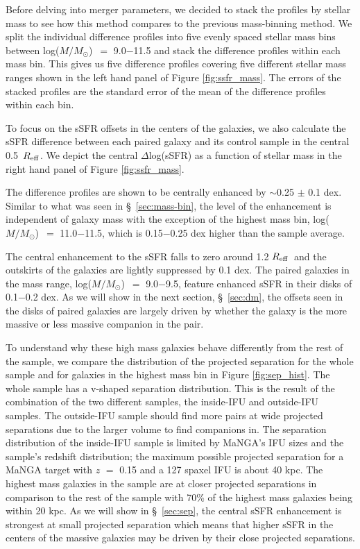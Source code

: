 \documentclass[iop,revtex4,twocolumn,apj,numberedappendix,appendixfloats]{emulateapj}
\newcommand{\reff}{$R_{\rm eff}$}
\newcommand{\logm}{log($M/M_{\odot}$)}
\begin{document}
Before delving into merger parameters, we decided to stack the profiles by stellar mass to see how this method compares to the previous mass-binning method. We split the individual difference profiles into five evenly spaced stellar mass bins between \logm\ $=$ 9.0$-$11.5 and stack the difference profiles within each mass bin. This gives us five difference profiles covering five different stellar mass ranges shown in the left hand panel of Figure \ref{fig:ssfr_mass}. The errors of the stacked profiles are the standard error of the mean of the difference profiles within each bin.

To focus on the sSFR offsets in the centers of the galaxies, we also calculate the sSFR difference between each paired galaxy and its control sample in the central 0.5~\reff. We depict the central $\Delta$log(sSFR) as a function of stellar mass in the right hand panel of Figure \ref{fig:ssfr_mass}.

The difference profiles are shown to be centrally enhanced by $\sim$0.25 $\pm$ 0.1 dex. Similar to what was seen in \S~\ref{sec:mass-bin}, the level of the enhancement is independent of galaxy mass with the exception of the highest mass bin, \logm\ $=$ 11.0$-$11.5, which is 0.15$-$0.25 dex higher than the sample average. 

The central enhancement to the sSFR falls to zero around 1.2 \reff\ and the outskirts of the galaxies are lightly suppressed by 0.1 dex. The paired galaxies in the mass range, \logm\ $=$ 9.0$-$9.5, feature enhanced sSFR in their disks of 0.1$-$0.2 dex. As we will show in the next section, \S~\ref{sec:dm}, the offsets seen in the disks of paired galaxies are largely driven by whether the galaxy is the more massive or less massive companion in the pair.

To understand why these high mass galaxies behave differently from the rest of the sample, we compare the distribution of the projected separation for the whole sample and for galaxies in the highest mass bin in Figure \ref{fig:sep_hist}. The whole sample has a v-shaped separation distribution. This is the result of the combination of the two different samples, the inside-IFU and outside-IFU samples. The outside-IFU sample should find more pairs at wide projected separations due to the larger volume to find companions in. The separation distribution of the inside-IFU sample is limited by MaNGA's IFU sizes and the sample's redshift distribution; the maximum possible projected separation for a MaNGA target with $z$ $=$ 0.15 and a 127 spaxel IFU is about 40 kpc. The highest mass galaxies in the sample are at closer projected separations in comparison to the rest of the sample with 70\% of the highest mass galaxies being within 20 kpc. As we will show in \S~\ref{sec:sep}, the central sSFR enhancement is strongest at small projected separation which means that higher sSFR in the centers of the massive galaxies may be driven by their close projected separations. 
\end{document}
